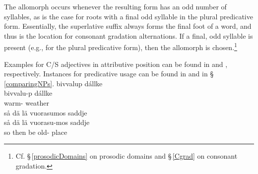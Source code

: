 The allomorph  occurs whenever the resulting form has an odd number of syllables, as is the case for roots with a final odd syllable in the plural predicative form. %
Essentially, the superlative suffix always forms the final foot of a word, and thus is the location for consonant gradation alternations. If a final, odd syllable is present (e.g., for the plural predicative form), then the \mbox{} allomorph is chosen.\footnote{Cf. §\,\ref{prosodicDomains} on prosodic domains and §\,\ref{Cgrad} on consonant gradation.} 

Examples for C/S adjectives in attributive position can be found in  and , respectively. Instances for predicative usage can be found in  and  in §\,\ref{comparingNPs}.
\ea\label{compATTRADJex1}
\glll	bivvalup dállke\\
	bivvalu-p dállke\\
	warm- weather\BS{}\\
{}	
\z
\ea\label{superlATTRADJex1}%
\glll	så dä lä vuorasumos saddje\\
	så dä lä vuorasu-mos saddje\\
	so then be\BS{} old- place\BS{}\\
{}	
\z

